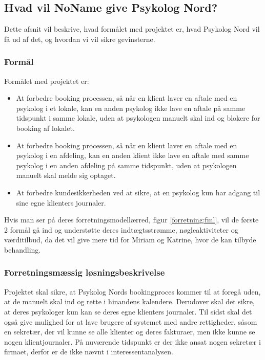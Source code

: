 \subsection{Hvad vil NoName give Psykolog Nord?}
Dette afsnit vil beskrive, hvad formålet med projektet er, hvad Psykolog Nord vil få ud af det, og hvordan vi vil sikre gevinsterne.

\subsubsection{Formål}
Formålet med projektet er:

\begin{itemize}
    \item At forbedre booking processen, så når en klient laver en aftale med en psykolog i et lokale, kan en anden psykolog ikke lave en aftale på samme tidspunkt i samme lokale, uden at psykologen manuelt skal ind og blokere for booking af lokalet.
    \item At forbedre booking processen, så når en klient laver en aftale med en psykolog i en afdeling, kan en anden klient ikke lave en aftale med samme psykolog i en anden afdeling på samme tidspunkt, uden at psykologen manuelt skal melde sig optaget.
    \item At forbedre kundesikkerheden ved at sikre, at en psykolog kun har adgang til sine egne klienters journaler.
\end{itemize}

Hvis man ser på deres forretningsmodellærred, figur \ref{forretning:fml}, vil de første 2 formål gå ind og understøtte deres indtægtsstrømme, nøgleaktiviteter og værditilbud, da det vil give mere tid for Miriam og Katrine, hvor de kan tilbyde behandling.
\subsubsection{Forretningsmæssig løsningsbeskrivelse}

Projektet skal sikre, at Psykolog Nords bookingproces kommer til at foregå uden, at de manuelt skal ind og rette i hinandens kalendere.
Derudover skal det sikre, at deres psykologer kun kan se deres egne klienters journaler. 
Til sidst skal det også give mulighed for at lave brugere af systemet med andre rettigheder, såsom en sekretær, der vil kunne se alle klienter og deres fakturaer, men ikke kunne se nogen klientjournaler. På nuværende tidspunkt er der ikke ansat nogen sekretær i firmaet, derfor er de ikke nævnt i interessentanalysen.

